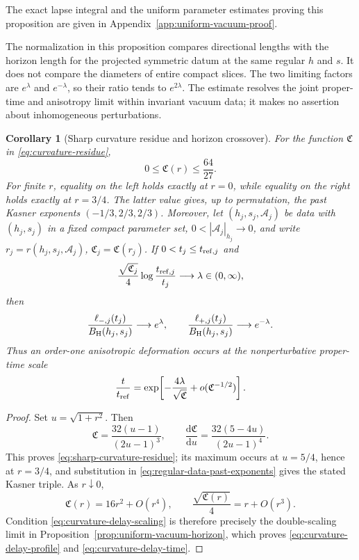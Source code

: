 \documentclass[10pt,a4paper]{article}
\numberwithin{equation}{section}
\newtheorem{corollary}[theorem]{Corollary}
\theoremstyle{definition}
\theoremstyle{remark}
\newcommand{\dd}{\mathrm d}
\begin{document}
The exact lapse integral and the uniform parameter estimates proving
this proposition are given in Appendix~\ref{app:uniform-vacuum-proof}.


The normalization in this proposition compares directional lengths
with the horizon length for the projected symmetric datum at the
same regular $h$ and $s$.  It does not compare the diameters of entire
compact slices.  The two limiting factors are $e^\lambda$ and
$e^{-\lambda}$, so their ratio tends to $e^{2\lambda}$.
The estimate resolves the joint proper-time and anisotropy limit
within invariant vacuum data; it makes no assertion about
inhomogeneous perturbations.

\begin{corollary}[Sharp curvature residue and horizon crossover]
\label{cor:curvature-delay-law}
For the function $\mathfrak C$ in \eqref{eq:curvature-residue},
\begin{equation}
 0\le\mathfrak C(r)\le\frac{64}{27}.
 \label{eq:sharp-curvature-residue}
\end{equation}
For finite $r$, equality on the left holds exactly at $r=0$, while
equality on the right holds exactly at $r=3/4$.  The latter value gives,
up to permutation, the past Kasner exponents
$(-1/3,2/3,2/3)$.  Moreover, let
$(h_j,s_j,\mathcal A_j)$ be data with $(h_j,s_j)$ in a fixed compact
parameter set, $0<|\mathcal A_j|_{h_j}\to0$, and write
$r_j=r(h_j,s_j,\mathcal A_j)$,
$\mathfrak C_j=\mathfrak C(r_j)$.  If
$0<t_j\le t_{{\rm ref},j}$ and
\begin{equation}
 \frac{\sqrt{\mathfrak C_j}}4
 \log\frac{t_{{\rm ref},j}}{t_j}\longrightarrow\lambda
 \in(0,\infty),
 \label{eq:curvature-delay-scaling}
\end{equation}
then
\begin{equation}
 \frac{\ell_{-,j}(t_j)}{B_{\rm H}(h_j,s_j)}\longrightarrow e^\lambda,
 \qquad
 \frac{\ell_{+,j}(t_j)}{B_{\rm H}(h_j,s_j)}\longrightarrow e^{-\lambda}.
 \label{eq:curvature-delay-profile}
\end{equation}
Thus an order-one anisotropic deformation occurs at the
nonperturbative proper-time scale
\begin{equation}
 \frac{t}{t_{\rm ref}}
 =\exp\!\left[-\frac{4\lambda}{\sqrt{\mathfrak C}}
          +o(\mathfrak C^{-1/2})\right].
 \label{eq:curvature-delay-time}
\end{equation}
\end{corollary}

\begin{proof}
Set $u=\sqrt{1+r^2}$.  Then
\[
 \mathfrak C=\frac{32(u-1)}{(2u-1)^3},\qquad
 \frac{\dd\mathfrak C}{\dd u}
 =\frac{32(5-4u)}{(2u-1)^4}.
\]
This proves \eqref{eq:sharp-curvature-residue}; its maximum occurs at
$u=5/4$, hence at $r=3/4$, and substitution in
\eqref{eq:regular-data-past-exponents} gives the stated Kasner triple.
As $r\downarrow0$,
\[
 \mathfrak C(r)=16r^2+O(r^4),\qquad
 \frac{\sqrt{\mathfrak C(r)}}4=r+O(r^3).
\]
Condition \eqref{eq:curvature-delay-scaling} is therefore precisely the
double-scaling limit in
Proposition~\ref{prop:uniform-vacuum-horizon}, which proves
\eqref{eq:curvature-delay-profile} and
\eqref{eq:curvature-delay-time}.
\end{proof}
\end{document}
